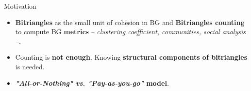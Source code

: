 \begin{frame}[fragile]{Motivation}
    \begin{itemize}
      \setlength\itemsep{1.5em}
      \item {\color{light}\textbf{Bitriangles} as the small unit of cohesion in BG and \textbf{Bitriangles counting} to compute BG \textbf{metrics} -- \emph{clustering coefficient, communities, social analysis --}.}
      \item {\color{light}Counting is \textbf{not enough}. Knowing \textbf{structural components of bitriangles} is needed.}
      \item \textbf{\emph{"All-or-Nothing" vs. "Pay-as-you-go"} model}. 
    \end{itemize}
\end{frame}

